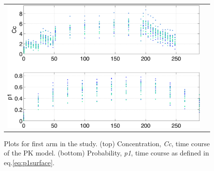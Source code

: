 \begin{figure}[htbp]
\centering
\begin{tabular}{cc}
\includegraphics[width=.6\textwidth]{pics/p1_armA} 
\end{tabular}
\caption{Plots for first arm in the study. (top) Concentration, \emph{Cc}, time course of the PK model. 
(bottom) Probability, \emph{p1}, time course as defined in eq.\ref{eq:p1surface}.}
\label{fig:lambdasurface}
\end{figure}


